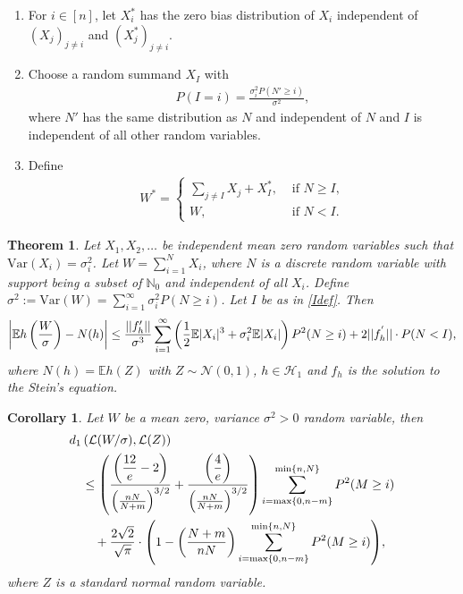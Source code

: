 \documentclass[10pt,a4paper]{amsart}
\newtheorem{theorem}{Theorem}
\newtheorem{corollary}{Corollary}
\newcommand{\E}{\mathbb{E}}
\newcommand{\Var}{\mathrm{Var}}
\newcommand{\bea}{\begin{eqnarray}}
\newcommand{\ena}{\end{eqnarray}}
\begin{document}
\begin{enumerate}
	\item For $i\in [n]$, let $X_i^*$ has the zero bias distribution of $X_i$ independent of $(X_j)_{j\ne i}$ and $(X_j^*)_{j\ne i}$.
	\item Choose a random summand $X_I$ with 
	\bea \label{Idef}
	P(I=i) = \frac{\sigma_i^2P(N'\ge i)}{\sigma^2},
	\ena  
	where $N'$ has the same distribution as $N$ and independent of $N$ and $I$ is independent of all other random variables.
	\item Define 
	\bea \label{Wsdef}
	W^* = \begin{cases}
		\sum_{j\ne I}X_j+X_I^*, &\text{ \ if \ } N \ge I,\\
		W,  &\text{ \ if \ } N<I.
	\end{cases}
	\ena
\end{enumerate}

\begin{theorem}\label{uniform}
	Let $X_1,X_2,\ldots$ be independent mean zero random variables such that $\Var(X_i) = \sigma_i^2$. Let $W=\sum_{i=1}^NX_i$, where $N$ is a discrete random variable with support being a subset of $\mathbb{N}_0$ and independent of all $X_i$.
		Define $\sigma^2 := \Var(W) = \sum_{i=1}^\infty\sigma_i^2 P(N\ge i)$. Let $I$ be as in \eqref{Idef}.  Then
	\begin{align*}
		\left|\E h\left(\frac{W}{\sigma}\right)-N(h)\right|\leq \frac{||f'_h||}{\sigma^3}\sum_{i=1}^\infty \left({1\over 2}\E|X_i|^3+ \sigma_i^2\E|X_i| \right)P^2(N\ge i)+2 ||f^{'}_{h}|| \cdot {P(N < I)},
	\end{align*}
	where $N(h) = \E h(Z)$ with $Z \sim \mathcal{N}(0,1)$, $h \in \mathcal{H}_1$ and $f_h$ is the solution to the Stein's equation.
	\end{theorem}

\begin{corollary}\label{Cor-outliers1}
	Let $W$ be a mean zero, variance $\sigma^2 >0$ random variable, then
	\begin{align*} &d_1\left(\mathcal{L}(W/\sigma), \mathcal{L}(Z) \right) \\&\quad \le\left({\left( \dfrac{12}{e}-2\right) \over \left({nN\over N+m}\right)^{3/2}} +{\left( \dfrac{4}{e}\right)\over \left({nN\over N+m}\right)^{3/2}}\right)\sum_{i=\max\{0,n-m\}}^{\min\{n,N\}} P^2(M\ge i)  \\&\quad \quad+{2\sqrt{2} \over \sqrt{\pi}}\cdot\displaystyle{\left(1- \left( \frac{N+m}{nN}\right)\sum_{i=\max\{0,n-m\}}^{\min\{n,N\}} P^2(M\ge i)\right)},\end{align*} where $Z$ is a standard normal random variable.
\end{corollary}
\end{document}
